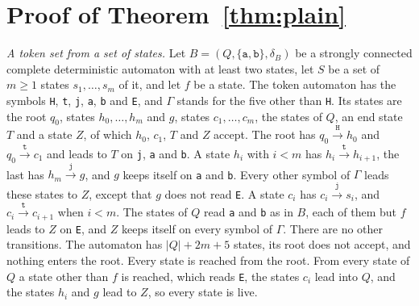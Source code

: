\documentclass[11pt,a4paper]{article}
\theoremstyle{definition}
\theoremstyle{plain}
\newcommand{\code}[1]{\texttt{#1}}
\begin{document}
\appendix
\section{Proof of Theorem~\ref{thm:plain}}
\label{app:plain}

\emph{A token set from a set of states.} Let $B = (Q, \{\code{a}, \code{b}\}, \delta_B)$ be a strongly connected
complete deterministic automaton with at least two states, let $S$ be a set of $m \geq 1$ states $s_1, \ldots, s_m$ of
it, and let $f$ be a state. The token automaton has the symbols \code{H}, \code{t}, \code{j}, \code{a}, \code{b} and
\code{E}, and $\Gamma$ stands for the five other than \code{H}. Its states are the root $q_0$, states $h_0, \ldots, h_m$
and $g$, states $c_1, \ldots, c_m$, the states of $Q$, an end state $T$ and a state $Z$, of which $h_0$, $c_1$, $T$ and
$Z$ accept. The root has $q_0 \xrightarrow{\code{H}} h_0$ and $q_0 \xrightarrow{\code{t}} c_1$ and leads to $T$ on
\code{j}, \code{a} and \code{b}. A state $h_i$ with $i < m$ has $h_i \xrightarrow{\code{t}} h_{i+1}$, the last has
$h_m \xrightarrow{\code{j}} g$, and $g$ keeps itself on \code{a} and \code{b}. Every other symbol of $\Gamma$ leads
these states to $Z$, except that $g$ does not read \code{E}. A state $c_i$ has $c_i \xrightarrow{\code{j}} s_i$, and
$c_i \xrightarrow{\code{t}} c_{i+1}$ when $i < m$. The states of $Q$ read \code{a} and \code{b} as in $B$, each of them
but $f$ leads to $Z$ on \code{E}, and $Z$ keeps itself on every symbol of $\Gamma$. There are no other transitions. The
automaton has $|Q| + 2m + 5$ states, its root does not accept, and nothing enters the root. Every state is reached from
the root. From every state of $Q$ a state other than $f$ is reached, which reads \code{E}, the states $c_i$ lead into
$Q$, and the states $h_i$ and $g$ lead to $Z$, so every state is live.
\end{document}
